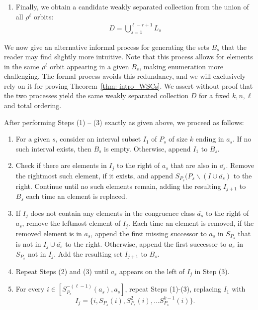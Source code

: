 \documentclass[11pt]{amsart}
\theoremstyle{plain}
\theoremstyle{definition}
\begin{document}
\begin{enumerate}
    \item Finally, we obtain a candidate weakly separated collection from the union of all $\rho^\ell$ orbits: 
    \begin{align*}
        D= \bigcup_{s=1}^{\ell-r+1} L_s
    \end{align*}

\end{enumerate}


 
We now give an alternative informal process for generating the sets $B_s$ that the reader may find slightly more intuitive. Note that this process allows for elements in the same $\rho^\ell$ orbit appearing in a given $B_s$, making enumeration more challenging. The formal process avoids this redundancy, and we will exclusively rely on it for proving Theorem~\ref{thm: intro_WSCs}. We assert without proof that the two processes yield the same weakly separated collection $D$ for a fixed $k,n,\ell$ and total ordering.

After performing Steps (1) -- (3) exactly as given above, we proceed as follows:
\begin{enumerate}
    
\item For a given $s$, consider an interval subset $I_1$ of $P_s$ of size $k$ ending in $a_s$. If no such interval exists, then $B_s$ is empty. Otherwise, append $I_1$ to $B_s$.

\item  Check if there are elements in $I_j$ to the right of $a_s$ that are also in $\overline{a_s}$. Remove the rightmost such element, if it exists, and append $S_{P_s}(P_s \backslash (I \cup \overline{a_s})$ to the right. Continue until no such elements remain, adding the resulting $I_{j+1}$ to $B_s$ each time an element is replaced. 

  \item If $I_j$ does not contain any elements in the congruence class $\overline{a_s}$ to the right of $a_s$, remove the leftmost element of $I_j$. Each time an element is removed, if the removed element is in $\overline{a_s}$, append the first missing successor to $a_s$ in $S_{P_s}$ that is not in $I_j\cup \overline{a_s}$ to the right. Otherwise, append the first successor to $a_s$ in $S_{P_s}$ not in $I_j$. Add the resulting set $I_{j+1}$ to $B_s$. 
    
\item Repeat Steps (2) and (3) until $a_s$ appears on the left of $I_j$ in Step (3). 

\item For every $i \in [S_{P_s}^{-(\ell-1)}(a_s), a_s]$, repeat Steps (1)-(3), replacing $I_1$ with $$I_j=\{i, S_{P_s}(i), S_{P_s}^2(i), \dots S_{P_s}^{k-1}(i)\}.$$ 
\end{enumerate}
\end{document}
